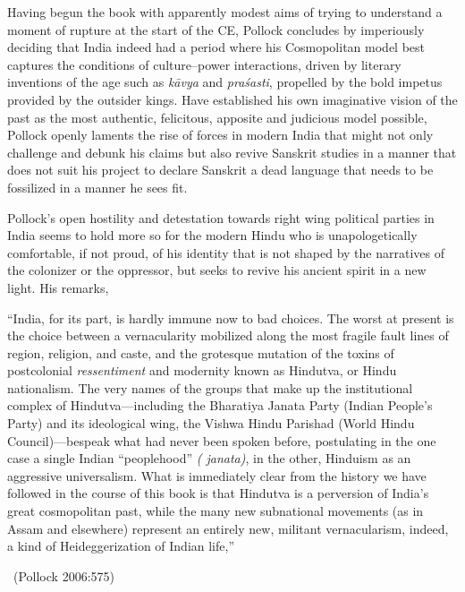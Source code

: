 Having begun the book with apparently modest aims of trying to understand a moment of rupture at the start of the CE, Pollock concludes by imperiously deciding that India indeed had a period where his Cosmopolitan model best captures the conditions of culture–power interactions, driven by literary inventions of the age such as \textit{kāvya} and \textit{praśasti}, propelled by the bold impetus provided by the outsider kings. Have established his own imaginative vision of the past as the most authentic, felicitous, apposite and judicious model possible, Pollock openly laments the rise of forces in modern India that might not only challenge and debunk his claims but also revive Sanskrit studies in a manner that does not suit his project to declare Sanskrit a dead language that needs to be fossilized in a manner he sees fit.

\vskip 5pt

Pollock’s open hostility and detestation towards right wing political parties in India seems to hold more so for the modern Hindu who is unapologetically comfortable, if not proud, of his identity that is not shaped by the narratives of the colonizer or the oppressor, but seeks to revive his ancient spirit in a new light. His remarks,

\vskip 5pt

\begin{myquote}
“India, for its part, is hardly immune now to bad choices. The worst at present is the choice between a vernacularity mobilized along the most fragile fault lines of region, religion, and caste, and the grotesque mutation of the toxins of postcolonial \textit{ressentiment} and modernity known as Hindutva, or Hindu nationalism. The very names of the groups that make up the institutional complex of Hindutva—including the Bharatiya Janata Party (Indian People’s Party) and its ideological wing, the Vishwa Hindu Parishad (World Hindu Council)—bespeak what had never been spoken before, postulating in the one case a single Indian “peoplehood” \textit{( janata)}, in the other, Hinduism as an aggressive universalism. What is immediately clear from the history we have followed in the course of this book is that Hindutva is a perversion of India’s great cosmopolitan past, while the many new subnational movements (as in Assam and elsewhere) represent an entirely new, militant vernacularism, indeed, a kind of Heideggerization of Indian life,” 

\vskip -5pt

~\hfill (Pollock 2006:575)
\end{myquote}

